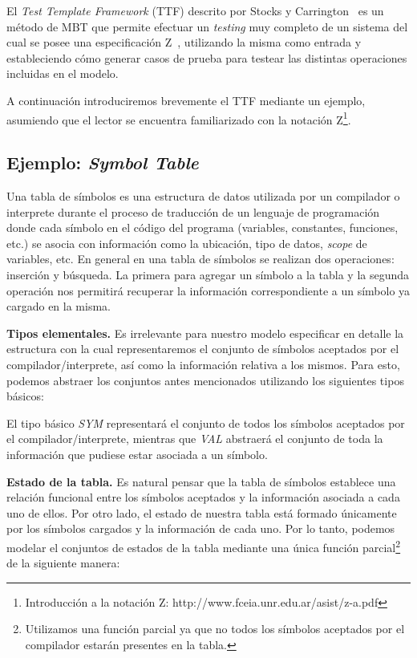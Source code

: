 El \textit{Test Template Framework} (TTF) descrito por Stocks y Carrington~\cite{stocks} es un método de MBT que permite efectuar un \textit{testing} muy completo de un sistema del cual se posee una especificación Z~\cite{spivey}, utilizando la misma como entrada y estableciendo cómo generar casos de prueba para testear las distintas operaciones incluidas en el modelo.

A continuación introduciremos brevemente el TTF mediante un ejemplo, asumiendo que el lector se encuentra familiarizado con la notación Z\footnote{Introducción a la notación Z: http://www.fceia.unr.edu.ar/asist/z-a.pdf}.

\subsection{Ejemplo: \emph{Symbol Table}}
\label{sec:ej-symbolTable}

Una tabla de símbolos es una estructura de datos utilizada por un compilador o interprete durante el proceso de traducción de un lenguaje de programación donde cada símbolo en el código del programa (variables, constantes, funciones, etc.) se asocia con información como la ubicación, tipo de datos, \textit{scope} de variables, etc. 
En general en una tabla de símbolos se realizan dos operaciones: inserción y búsqueda. La primera para agregar un símbolo a la tabla y la segunda operación nos permitirá recuperar la información correspondiente a un símbolo ya cargado en la misma.


\bigskip
\noindent
\textbf{Tipos elementales.} Es irrelevante para nuestro modelo especificar en detalle la estructura con la cual representaremos el conjunto de símbolos aceptados por el compilador/interprete, así como la información relativa a los mismos. Para esto, podemos abstraer los conjuntos antes mencionados utilizando los siguientes tipos básicos: 

\begin{zed}
\end{zed}

El tipo básico \emph{SYM} representará el conjunto de todos los símbolos aceptados por el compilador/interprete, mientras que \emph{VAL} abstraerá el conjunto de toda la información que pudiese estar asociada a un símbolo.
 
\bigskip
\noindent
\textbf{Estado de la tabla.} Es natural pensar que la tabla de símbolos establece una relación funcional entre los símbolos aceptados y la información asociada a cada uno de ellos. Por otro lado, el estado de nuestra tabla está formado únicamente por los símbolos cargados y la información de cada uno. Por lo tanto, podemos modelar el conjuntos de estados de la tabla mediante una única función parcial\footnote{Utilizamos una función parcial ya que no todos los símbolos aceptados por el compilador estarán presentes en la tabla.} de la siguiente manera:

